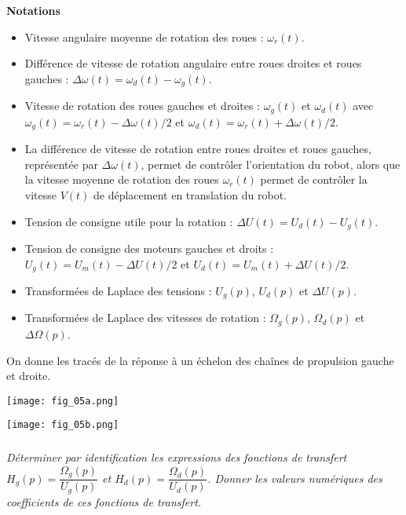 \begin{multicols}{2}
\textbf{Notations}
\begin{itemize}
\item Vitesse angulaire moyenne de rotation des roues : $\omega_r (t)$. 
\item Différence de vitesse de rotation angulaire entre roues droites et roues gauches : $\Delta\omega(t) = \omega_d (t) - \omega_g (t)$.
\item Vitesse de rotation des roues gauches et droites : $\omega_g (t)$ et $\omega_d (t)$ avec $\omega_g (t)  = \omega_r (t)  - \Delta \omega(t)/2$  et $\omega_d (t)  = \omega_r (t)  + \Delta\omega(t)/2$. 
\item La différence de vitesse de rotation entre roues droites et roues gauches, représentée par $\Delta \omega(t)$, permet de contrôler l’orientation du robot, alors que la vitesse moyenne de rotation des roues $\omega_r (t)$  permet de contrôler la vitesse $V(t)$ de déplacement en translation du robot. 
\item Tension de consigne utile pour la rotation : $\Delta U(t)  = U_d (t)  - U_g (t)$. 
\item Tension de consigne des moteurs gauches et droits :
$U_g(t)=U_m (t)-\Delta U(t)/2$
et $U_d (t)=U_m (t)+\Delta U(t)/2$. 
\item Transformées de Laplace des tensions : $U_g (p)$, $U_d (p)$ et $\Delta U(p)$. 
\item Transformées de Laplace des vitesses de rotation : $\Omega_g (p)$, $\Omega_d (p)$ et $\Delta \Omega(p)$. 
\end{itemize}
\fi


\ifprof
\else
On donne les tracés de la réponse à un échelon des chaînes de propulsion gauche et droite.  

\begin{center}
\texttt{[image: fig\_05a.png]}
\end{center}

\begin{center}
\texttt{[image: fig\_05b.png]}
\end{center}
\fi


\subparagraph{}
\textit{Déterminer par identification les expressions des fonctions de transfert $H_g(p) = \dfrac{\Omega_g(p)}{U_g(p)}$ et
$H_d(p) = \dfrac{\Omega_d(p)}{U_d(p)}$.  Donner les valeurs numériques des coefficients de ces fonctions de transfert. }
\ifprof
\begin{corrige}
\end{corrige}
\else
\fi


\end{multicols}
